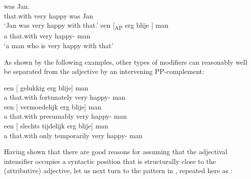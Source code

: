 \documentclass[output=paper]{langsci/langscibook}
\begin{document}
\ea%
    \label{ex:key:18.40}
	\ea
	 was Jan.\\
        {} \phantom{〈}that.with very {} happy {} {} was Jan\\
	\glt \enquote*{Jan was very happy with that.}
	\ex
	\gll    een [\textsubscript{AP}  erg  blije  ] man\\
            a {} \phantom{〈}that.with very {} happy-\Agr{} {} {} man\\
	\glt \enquote*{a man who is very happy with that}
	\z
\z

As shown by the following examples, other types of modifiers can reasonably
well be separated from the adjective by an intervening PP-complement:

\ea%
    \label{ex:key:18.41}
	\ea
	\gll een [   gelukkig        erg        blije]        man\\
        a {} \phantom{〈}that.with      fortunately        {}                  very         {}             happy-\Agr{}    man\\
	\ex
	\gll een [   vermoedelijk    erg        blije]    man\\
        a {}         \phantom{〈}that.with      presumably       {}                     very      {}            happy-\Agr{}    man\\
	\ex
	\gll een [   slechts    tijdelijk      erg        blije]    man\\
        a   {}     \phantom{〈}that.with        only    temporarily      {}
        very         {}           happy-\Agr{}    man\\
	\z
\z

Having shown that there are good reasons for assuming that the adjectival
intensifier occupies a syntactic position that is structurally close to the
(attributive) adjective, let us next turn to the pattern in ,
repeated here as :

\ea%
    \label{ex:key:18.42}
	\z
\z
\end{document}
